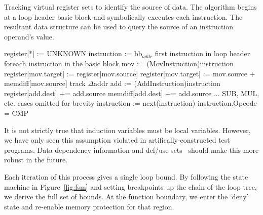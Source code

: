 \begin{algorithm}

  \caption{Tracking virtual register sets to identify the source
  of data.  The algorithm begins at a loop header basic block and
  symbolically executes each instruction.  The resultant data structure
  can be used to query the source of an instruction operand's value.}

  \label{alg:sinterp}
  \begin{algorithmic}[1]
    \State register[*] := UNKNOWN
    \State instruction := bb$_{addr}$ \Comment first instruction in loop header
    \Repeat \Comment foreach instruction in the basic block
        \State mov := (MovInstruction)instruction
          \State register[mov.target] := register[mov.source]
          \State register[mov.target] := mov.source +\\
                            \hspace{14.4em} memdiff[mov.source]
        \EndIf
      \EndIf
       \Comment track $\Delta$addr
        \State add := (AddInstruction)instruction
          \State register[add.dest] += add.source
        \EndIf
          \State memdiff[add.dest] += add.source
        \EndIf
      \EndIf
			\State \Comment ... SUB, MUL, etc. cases omitted for brevity
      \State instruction := next(instruction)
    \Until instruction.Opcode = CMP
  \end{algorithmic}
\end{algorithm}

It is not strictly true that induction variables must be local
variables.  However, we have only seen this assumption violated in
artifically-constructed test programs.  Data dependency information and
def/use sets~\cite{Torczon:2007:Compiler} should make this more robust
in the future.

Each iteration of this process gives a single loop bound.  By following
the
state machine in Figure~\ref{fig:fsm} and setting breakpoints up the
chain of the loop tree, we derive the full set of bounds.  At the
function boundary, we enter the `deny' state and re-enable memory
protection for that region.


